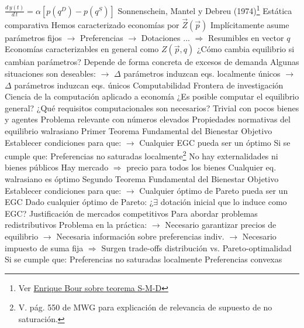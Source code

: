 \documentclass{nuevotema}
\begin{document}
\begin{esquemal}
				\4[] $\frac{d \, y(t)}{d \, t} = \alpha \left[ p(q^D) - p(q^S) \right]$
				\4[] 
				\4 Sonnenschein, Mantel y Debreu (1974)\footnote{Ver \href{http://www.ebour.com.ar/ensayos_meyde/Los\%20resultados\%20de\%20Sonnenschein,\%20Mantel\%20y\%20Debreu\%20en\%20Teoria\%20del\%20Equilibrio\%20General.pdf}{Enrique Bour sobre teorema S-M-D}}
			\3 Estática comparativa
				\4 Hemos caracterizado economías por $\vec{Z}(\vec{p})$
				\4[] Implícitamente asume parámetros fijos
				\4[] $\to$ Preferencias
				\4[] $\to$ Dotaciones
				\4[] ...
				\4[] $\Rightarrow$ Resumibles en vector $q$
				\4 Economías caracterizables en general como $Z(\vec{p}, q)$
				\4 ¿Cómo cambia equilibrio si cambian parámetros?
				\4 Depende de forma concreta de excesos de demanda
				\4[] Algunas situaciones son deseables:
				\4[] $\to$ $\Delta$ parámetros induzcan eqs. localmente únicos
				\4[] $\to$ $\Delta$ parámetros induzcan eqs. únicos
				\4[] 
			\3 Computabilidad
				\4 Frontera de investigación
				\4[] Ciencia de la computación aplicado a economía
				\4 ¿Es posible computar el equilibrio general?
				\4 ¿Qué requisitos computacionales son necesarios?
				\4[$\Rightarrow$] Trivial con pocos bienes y agentes
				\4[$\Rightarrow$] Problema relevante con números elevados
		\2 Propiedades normativas del equilibrio walrasiano
			\3 Primer Teorema Fundamental del Bienestar
				\4 Objetivo
				\4[] Establecer condiciones para que:
				\4[] $\to$ Cualquier EGC pueda ser un óptimo
				\4 Si se cumple que:
				\4[] Preferencias no saturadas localmente\footnote{V. pág. 550 de MWG para explicación de relevancia de supuesto de no saturación.}
				\4[] No hay externalidades ni bienes públicos
				\4[] Hay mercado $\Rightarrow$ precio para todos los bienes
				\4[$\Rightarrow$] Cualquier eq. walrasiano es óptimo
			\3 Segundo Teorema Fundamental del Bienestar
				\4 Objetivo
				\4[] Establecer condiciones para que:
				\4[] $\to$ Cualquier óptimo de Pareto pueda ser un EGC
				\4 Dado cualquier óptimo de Pareto:
				\4[] ¿$\exists$ dotación inicial que lo induce como EGC?
				\4 Justificación de mercados competitivos
				\4[] Para abordar problemas redistributivos
				\4[] Problema en la práctica:
				\4[] $\to$ Necesario garantizar precios de equilibrio
				\4[] $\to$ Necesaria información sobre preferencias indiv.
				\4[] $\to$ Necesario impuesto de suma fija
				\4[] $\Rightarrow$ Surgen trade-offs distribución vs. Pareto-optimalidad
				\4 Si se cumple que:
				\4[] Preferencias no saturadas localmente
				\4[] Preferencias convexas

\end{esquemal}
\end{document}
